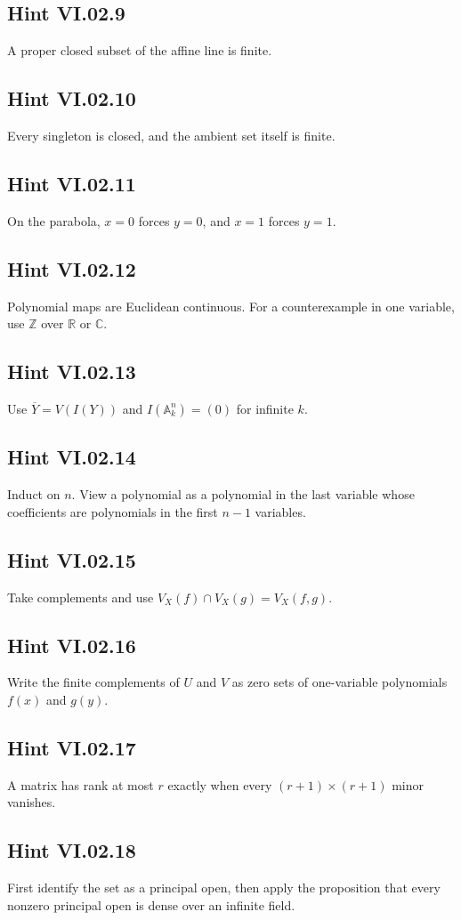 \subsection*{Hint VI.02.9}
A proper closed subset of the affine line is finite.

\subsection*{Hint VI.02.10}
Every singleton is closed, and the ambient set itself is finite.

\subsection*{Hint VI.02.11}
On the parabola, \(x=0\) forces \(y=0\), and \(x=1\) forces \(y=1\).

\subsection*{Hint VI.02.12}
Polynomial maps are Euclidean continuous.  For a counterexample in one variable, use
\(\mathbb Z\) over \(\mathbb R\) or \(\mathbb C\).

\subsection*{Hint VI.02.13}
Use \(\overline Y=V(I(Y))\) and \(I(\mathbb A_k^n)=(0)\) for infinite \(k\).

\subsection*{Hint VI.02.14}
Induct on \(n\).  View a polynomial as a polynomial in the last variable whose coefficients
are polynomials in the first \(n-1\) variables.

\subsection*{Hint VI.02.15}
Take complements and use \(V_X(f)\cap V_X(g)=V_X(f,g)\).

\subsection*{Hint VI.02.16}
Write the finite complements of \(U\) and \(V\) as zero sets of one-variable polynomials
\(f(x)\) and \(g(y)\).

\subsection*{Hint VI.02.17}
A matrix has rank at most \(r\) exactly when every \((r+1)\times(r+1)\) minor vanishes.

\subsection*{Hint VI.02.18}
First identify the set as a principal open, then apply the proposition that every nonzero
principal open is dense over an infinite field.
